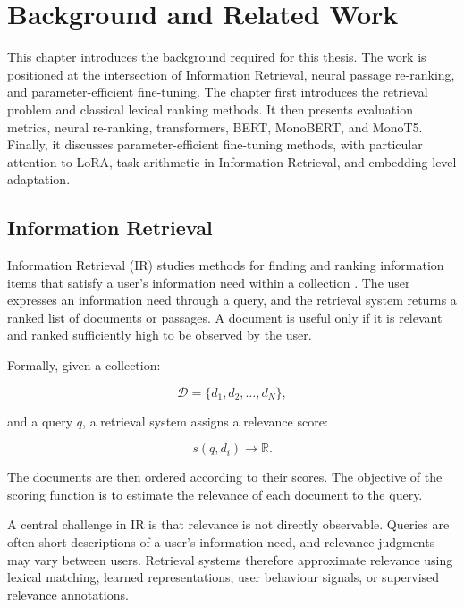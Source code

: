 \chapter{Background and Related Work}
\label{ch:background}

This chapter introduces the background required for this thesis. The work is positioned at the intersection of Information Retrieval, neural passage re-ranking, and parameter-efficient fine-tuning. The chapter first introduces the retrieval problem and classical lexical ranking methods. It then presents evaluation metrics, neural re-ranking, transformers, BERT, MonoBERT, and MonoT5. Finally, it discusses parameter-efficient fine-tuning methods, with particular attention to LoRA, task arithmetic in Information Retrieval, and embedding-level adaptation.

\section{Information Retrieval}
\label{sec:background_ir}

Information Retrieval (IR) studies methods for finding and ranking information items that satisfy a user's information need within a collection \cite{manning2008ir}. The user expresses an information need through a query, and the retrieval system returns a ranked list of documents or passages. A document is useful only if it is relevant and ranked sufficiently high to be observed by the user.

Formally, given a collection:

\begin{equation}
    \mathcal{D} = \{d_1, d_2, \ldots, d_N\},
\end{equation}

and a query $q$, a retrieval system assigns a relevance score:

\begin{equation}
    s(q,d_i) \rightarrow \mathbb{R}.
\end{equation}

The documents are then ordered according to their scores. The objective of the scoring function is to estimate the relevance of each document to the query.

A central challenge in IR is that relevance is not directly observable. Queries are often short descriptions of a user's information need, and relevance judgments may vary between users. Retrieval systems therefore approximate relevance using lexical matching, learned representations, user behaviour signals, or supervised relevance annotations.


